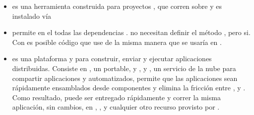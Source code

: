 	\begin{itemize}
		\item
			\textbf{\grunttoolNAME} es una herramienta \commandLine \taskBased construida para proyectos \javaScriptNAME, que corren sobre \nodejsNAME y es instalado vía \npm \cite{technology_gruntjs}

		\item
			\textbf{\browserifyNAME} permite \requireINT \modulesAS en el \browsersINT \bundlingUpCPT todas las dependencias \cite{online_official_website_browserify}. \browsersINT no necesitan definir el método \requestINT, pero \nodejsNAME si. Con \browserifyNAME es posible \writeCPT código que use \requireINT de la misma manera que se usaría en \nodejsNAME  \cite{online_official_website_browserify}.

		\item
			\textbf{\dockerNAME} es una plataforma \openSourcePC y \sysadmins para construir, enviar y ejecutar aplicaciones distribuidas. Consiste en \dockerNAME \engine, un portable, \lightweightPL \runtimeCPT y \packagingCPT \tool, y \dockerNAME \hub, un servicio de la nube para compartir aplicaciones y \workflowsCPT automatizados, \dockerNAME permite que las aplicaciones sean rápidamente ensamblados desde componentes y elimina la fricción entre \developmentPC, \qaSIGLA y \productionPC \environmentsPL. Como resultado, puede ser entregado rápidamente y correr la misma aplicación, sin cambios, en \laptops, \dataPC \centerCustom \vmsSIGLA, y cualquier otro recurso provisto por \internet \cite{technology_docker}.


\end{itemize}
